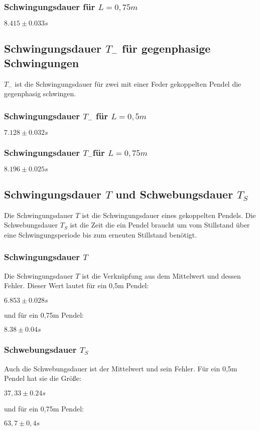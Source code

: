 \subsubsection{Schwingungsdauer für $L=0,75m$}
\begin{center}
 $8.415\pm0.033s$ 
\end{center}

\subsection{Schwingungsdauer $T_-$ für gegenphasige Schwingungen}
$T_-$ ist die Schwingungsdauer für zwei mit einer Feder gekoppelten Pendel die gegenphasig schwingen.
\subsubsection{Schwingungsdauer $T_-$ für $L=0,5m$}
\begin{center}
  $7.128\pm0.032s$
\end{center}
\subsubsection{Schwingungsdauer $T_-$für $L=0,75m$}
\begin{center}
  $8.196\pm0.025s$
\end{center}


\subsection{Schwingungsdauer $T$ und Schwebungsdauer $T_S$}
Die Schwingungsdauer $T$ ist die Schwingungsdauer eines gekoppelten Pendels. Die Schwebungsdauer $T_S$ ist 
die Zeit die ein Pendel braucht um vom Stillstand über eine Schwingungsperiode bis zum erneuten Stillstand benötigt.
\subsubsection{Schwingungsdauer $T$}
Die Schwingungsdauer $T$ ist die Verknüpfung aus dem Mittelwert und dessen Fehler.
Dieser Wert lautet für ein 0,5m Pendel:
\begin{center}
  $6.853\pm0.028s$
\end{center}
und für ein 0,75m Pendel:
\begin{center}
  $8.38\pm0.04s$
\end{center}
\subsubsection{Schwebungsdauer $T_S$}
Auch die Schwebungsdauer ist der Mittelwert und sein Fehler.
Für ein 0,5m Pendel hat sie die Größe:
\begin{center}
  $37,33\pm0.24s$
\end{center}
und für ein 0,75m Pendel:
\begin{center}
  $63,7\pm0,4s$
\end{center}


